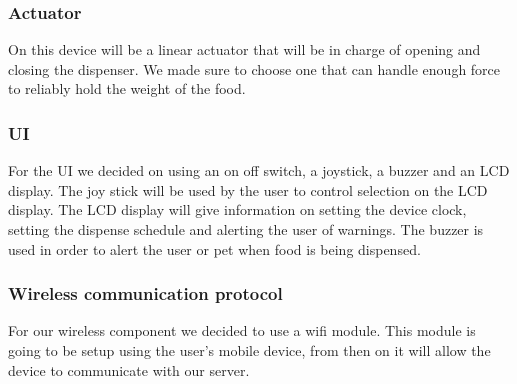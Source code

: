 \documentclass{article}
\begin{document}
\subsubsection{Actuator}
On this device will be a linear actuator that will be in charge of opening and closing the dispenser. We made sure to choose one that can handle enough force to reliably hold the weight of the food.
\subsubsection{UI}
For the UI we decided on using an on off switch, a joystick, a buzzer and an LCD display. The joy stick will be used by the user to control selection on the LCD display. The LCD display will give information on setting the device clock, setting the dispense schedule and alerting the user of warnings. The buzzer is used in order to alert the user or pet when food is being dispensed.
\subsubsection{Wireless communication protocol}
For our wireless component we decided to use a wifi module. This module is going to be setup using the user's mobile device, from then on it will allow the device to communicate with our server.
\end{document}
